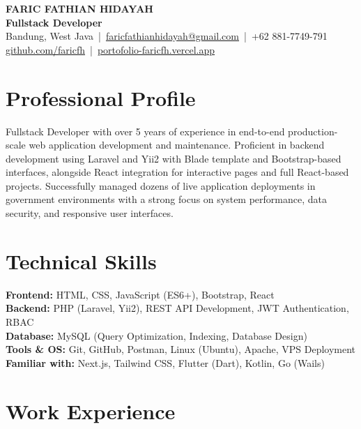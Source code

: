 \documentclass[11pt,a4paper]{article}
\begin{document}
\begin{center}
  {\LARGE \textbf{FARIC FATHIAN HIDAYAH}}\\
  \vspace{4pt}
  \textbf{Fullstack Developer} \\
  \vspace{6pt}
  Bandung, West Java \,|\, 
  \href{mailto:faricfathianhidayah@gmail.com}{faricfathianhidayah@gmail.com} \,|\, 
  +62 881-7749-791 \\
  \href{https://github.com/faricfh}{github.com/faricfh} \,|\, 
  \href{https://portofolio-faricfh.vercel.app}{portofolio-faricfh.vercel.app}
\end{center}

\section*{Professional Profile}
Fullstack Developer with over 5 years of experience in end-to-end production-scale web application development and maintenance. Proficient in backend development using Laravel and Yii2 with Blade template and Bootstrap-based interfaces, alongside React integration for interactive pages and full React-based projects. Successfully managed dozens of live application deployments in government environments with a strong focus on system performance, data security, and responsive user interfaces.

\section*{Technical Skills}
\textbf{Frontend:} HTML, CSS, JavaScript (ES6+), Bootstrap, React \\
\textbf{Backend:} PHP (Laravel, Yii2), REST API Development, JWT Authentication, RBAC \\
\textbf{Database:} MySQL (Query Optimization, Indexing, Database Design) \\
\textbf{Tools \& OS:} Git, GitHub, Postman, Linux (Ubuntu), Apache, VPS Deployment \\
\textbf{Familiar with:} Next.js, Tailwind CSS, Flutter (Dart), Kotlin, Go (Wails)

\section*{Work Experience}
\end{document}
